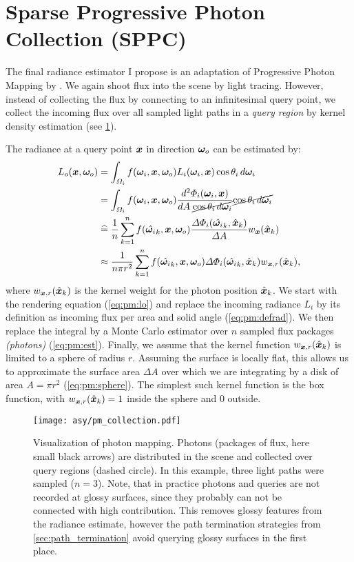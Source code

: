 \section{Sparse Progressive Photon Collection (SPPC)}
\label{sec:sppc}
The final radiance estimator I propose is an adaptation of Progressive Photon Mapping by \textcite{jensen1996,hachisuka2008}.
We again shoot flux into the scene by light tracing.
However, instead of collecting the flux by connecting to an infinitesimal query point, we collect the incoming flux over all sampled light paths in a \emph{query region} by kernel density estimation (see \cref{fig:pm_collection}).

The radiance at a query point $\bm{x}$ in direction ${\bm{\omega}_o}$ can be estimated by:
\begin{subequations}
\label{eq:pm}
\begin{align}
    L_o(\bm{x}, {\bm{\omega}_o})
    &= \int_{\Omega_i} f({\bm{\omega}_i}, \bm{x}, {\bm{\omega}_o}) L_i({\bm{\omega}_i}, \bm{x}) \cos{\theta_i} \mathop{}\!d{\bm{\omega}_i} \label{eq:pm:lo}\\
    &= \int_{\Omega_i} f({\bm{\omega}_i}, \bm{x}, {\bm{\omega}_o}) \frac{\mathop{}\!d^2 \Phi_i({\bm{\omega}_i}, \bm{x})}{\mathop{}\!d A \; \cancel{\cos{\theta_i} \mathop{}\!d{\bm{\omega}_i}}} \cancel{\cos{\theta_i} \mathop{}\!d{\bm{\omega}_i}} \label{eq:pm:defrad}\\
    &\mathrel{\widehat{=}} \frac{1}{n} \sum_{k=1}^n f(\hat{{\bm{\omega}_i}}_k, \bm{x}, {\bm{\omega}_o}) \frac{\Delta \Phi_i(\hat{{\bm{\omega}_i}}_k, \hat{\bm{x}}_k)}{\Delta A} w_{\bm{x}}(\hat{\bm{x}}_k)\label{eq:pm:est}\\
    &\approx \frac{1}{n \pi r^2} \sum_{k=1}^n f(\hat{{\bm{\omega}_i}}_k, \bm{x}, {\bm{\omega}_o}) \Delta \Phi_i(\hat{{\bm{\omega}_i}}_k, \hat{\bm{x}}_k) w_{\bm{x},r}(\hat{\bm{x}}_k), \label{eq:pm:sphere}
\end{align}
\end{subequations}
where $w_{\bm{x},r}(\hat{\bm{x}}_k)$ is the kernel weight for the photon position $\hat{\bm{x}}_k$.
We start with the rendering equation (\cref{eq:pm:lo}) and replace the incoming radiance $L_i$ by its definition as incoming flux per area and solid angle (\cref{eq:pm:defrad}).
We then replace the integral by a Monte Carlo estimator over $n$ sampled flux packages \emph{(photons)} (\cref{eq:pm:est}).
Finally, we assume that the kernel function $w_{\bm{x},r}(\hat{\bm{x}}_k)$ is limited to a sphere of radius $r$.
Assuming the surface is locally flat, this allows us to approximate the surface area $\Delta A$ over which we are integrating by a disk of area $A=\pi r^2$ (\cref{eq:pm:sphere}).
The simplest such kernel function is the box function, with $w_{\bm{x},r}(\hat{\bm{x}}_k)=1$ inside the sphere and $0$ outside.
\begin{figure}[htb!]
    \centering
    \texttt{[image: asy/pm\_collection.pdf]}
    \caption{Visualization of photon mapping. Photons (packages of flux, here small black arrows) are distributed in the scene and collected over query regions (dashed circle). In this example, three light paths were sampled ($n=3$). Note, that in practice photons and queries are not recorded at glossy surfaces, since they probably can not be connected with high contribution. This removes glossy features from the radiance estimate, however the path termination strategies from \cref{sec:path_termination} avoid querying glossy surfaces in the first place.}
    \label{fig:pm_collection}
\end{figure}

